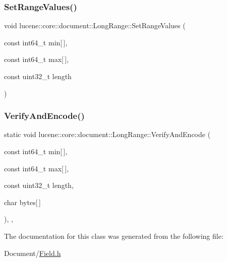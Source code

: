 \subsubsection{\texorpdfstring{Set\+Range\+Values()}{SetRangeValues()}}
{\footnotesize\ttfamily void lucene\+::core\+::document\+::\+Long\+Range\+::\+Set\+Range\+Values (\begin{DoxyParamCaption}\item[{const int64\+\_\+t}]{min\mbox{[}$\,$\mbox{]},  }\item[{const int64\+\_\+t}]{max\mbox{[}$\,$\mbox{]},  }\item[{const uint32\+\_\+t}]{length }\end{DoxyParamCaption})\hspace{0.3cm}{\ttfamily [inline]}}

\mbox{\label{classlucene_1_1core_1_1document_1_1LongRange_acc112551134a7e54e9480e3ef5dca2d0}} 
\subsubsection{\texorpdfstring{Verify\+And\+Encode()}{VerifyAndEncode()}}
{\footnotesize\ttfamily static void lucene\+::core\+::document\+::\+Long\+Range\+::\+Verify\+And\+Encode (\begin{DoxyParamCaption}\item[{const int64\+\_\+t}]{min\mbox{[}$\,$\mbox{]},  }\item[{const int64\+\_\+t}]{max\mbox{[}$\,$\mbox{]},  }\item[{const uint32\+\_\+t}]{length,  }\item[{char}]{bytes\mbox{[}$\,$\mbox{]} }\end{DoxyParamCaption})\hspace{0.3cm}{\ttfamily [inline]}, {\ttfamily [static]}, {\ttfamily [private]}}



The documentation for this class was generated from the following file\+:\begin{DoxyCompactItemize}
\item 
Document/\mbox{\hyperlink{Document_2Field_8h}{Field.\+h}}\end{DoxyCompactItemize}

